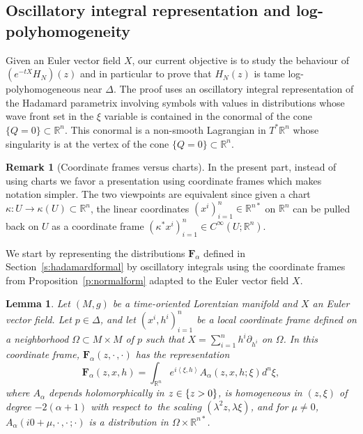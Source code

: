 \documentclass[10pt]{amsart}
\newtheorem{lemma}[theorem]{Lemma}
\theoremstyle{definition}
\newtheorem{remark}[theorem]{Remark}
\let\cv\alpha
\let\euler X
\let\Im\relax
\DeclareMathOperator{\Im}{Im}
\renewcommand{\sec}[1]{Section~\ref{#1}}
\begin{document}
\subsection{Oscillatory integral representation and log-polyhomogeneity}\label{ss:polhom} Given an Euler vector field $\euler$, our current objective is to study the behaviour
of $\left(e^{-t\euler}H_N\right)(z)$ and in particular to prove that
$H_N(z)$ is tame log-polyhomogeneous near $\Delta$. The proof uses an
oscillatory integral representation of the Hadamard parametrix involving
symbols with values in distributions whose wave front set in the $\xi$ variable is contained in the conormal of the cone $\{Q=0\}\subset \mathbb{R}^n$. This conormal is a non-smooth Lagrangian in $T^*\mathbb{R}^n$ whose singularity is at the vertex of the cone $\{Q=0\}\subset \mathbb{R}^n$.

\begin{remark}[Coordinate frames versus charts]
In the present part, instead of using charts we
favor a presentation using coordinate frames
which makes notation
simpler. The two viewpoints are equivalent
since given a chart $\kappa:U\to \kappa(U)\subset \mathbb{R}^n$, the linear
coordinates $(x^i)_{i=1}^n \in \mathbb{R}^{n*}$ on $\mathbb{R}^n$ can be pulled back on
$U$ as a coordinate frame $(\kappa^*x^i)_{i=1}^n\in C^\infty(U;\mathbb{R}^n)$.
\end{remark}

We start by representing the distributions $\mathbf{F}_\cv$ defined in \sec{s:hadamardformal} by oscillatory integrals using the
coordinate frames from Proposition~\ref{p:normalform} adapted to
the Euler vector field $\euler$.

\begin{lemma}\label{l:kuranishi}
Let $(M,g)$ be a time-oriented Lorentzian manifold and $\euler$ an Euler vector field. Let $p\in \Delta$, and let $(x^i,h^i)_{i=1}^n$ be a local coordinate frame defined on a neighborhood $\Omega\subset M\times M$ of $p$ such that $\euler=\sum_{i=1}^n h^i\partial_{h^i}$ on $\Omega$.
In this coordinate frame, $\mathbf{F}_\cv(z,\cdot\,,\cdot)$ has the representation
\[
\mathbf{F}_\cv(z,x,h)=\int_{\mathbb{R}^n} e^{i\left\langle\xi,h\right\rangle} A_\cv(z,x,h;\xi) d^n\xi,
\]
where $A_\cv$ depends holomorphically in $z\in \{\Im z>0\}$, is homogeneous in $(z,\xi)$ of degree $-2(\cv+1)$
with respect to~the scaling
$(\lambda^2z,\lambda\xi) $, and for $\mu\neq 0$, $A_\cv(i0+\mu,\cdot\,,\cdot\,;\cdot)$ is a {distribution} in $\Omega\times \mathbb{R}^{n*}$.
\end{lemma}
\end{document}

